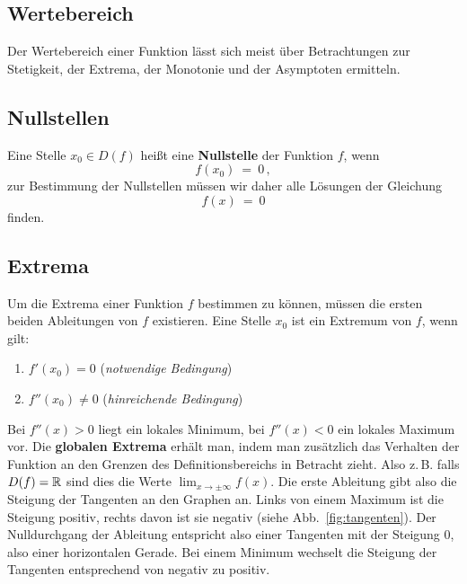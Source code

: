 
\subsection{Wertebereich}

Der Wertebereich einer Funktion lässt sich meist über Betrachtungen zur
Stetigkeit, der Extrema, der Monotonie und der Asymptoten ermitteln.



\subsection{Nullstellen}

Eine Stelle $x_0\in{}D(f)$ heißt eine \textbf{Nullstelle} der Funktion $f$,
wenn
\[
f(x_0)
\ =\ 0
\,,
\]
zur Bestimmung der Nullstellen müssen wir daher alle Lösungen der Gleichung \[f(x)\ =\ 0 \] finden.


\subsection{Extrema}

Um die Extrema einer Funktion $f$ bestimmen zu können, müssen die ersten beiden Ableitungen von $f$ existieren. Eine Stelle $x_0$ ist ein Extremum von $f$, wenn gilt:
\begin{enumerate}
\item $f'(x_0) = 0$ (\emph{notwendige Bedingung}) 
\item $f''(x_0) \neq 0$ (\emph{hinreichende Bedingung})
\end{enumerate}

\noindent Bei $f''(x)>0$ liegt ein lokales Minimum, bei $f''(x)<0$ ein lokales Maximum vor.
\newline \newline
\noindent Die \textbf{globalen Extrema} erhält man, indem man zusätzlich das Verhalten der
Funktion an den Grenzen des Definitionsbereichs in Betracht zieht. Also z.\,B.
falls $D(f)=\mathbb{R}$ sind dies die Werte $\lim_{x\to\pm\infty}f(x)$.
\newline \newline
\noindent Die erste Ableitung gibt also die Steigung der Tangenten an den Graphen an. Links von einem Maximum ist die Steigung positiv, rechts davon ist sie negativ (siehe Abb.~\ref{fig:tangenten}). Der Nulldurchgang der Ableitung entspricht also einer Tangenten mit der Steigung $0$, also einer horizontalen Gerade. Bei einem Minimum wechselt die Steigung der Tangenten entsprechend von negativ zu positiv.

